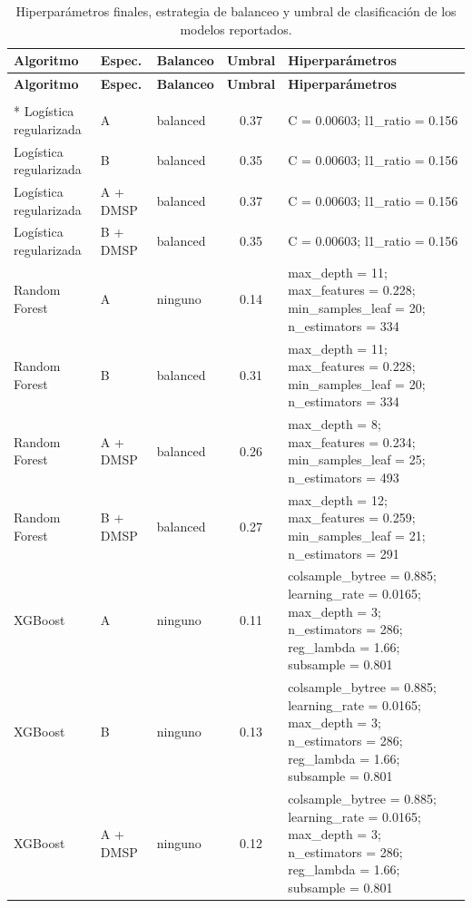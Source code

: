 {\footnotesize
\captionsetup{font=normalsize}
\setlength{\tabcolsep}{4pt}
\begin{longtable}{lllc>{\raggedright\arraybackslash}p{}}
  \caption{Hiperparámetros finales, estrategia de balanceo y umbral de clasificación de los modelos reportados.}
  \label{tab:hiperparametros} \\
  \toprule
  \textbf{Algoritmo} & \textbf{Espec.} & \textbf{Balanceo} & \textbf{Umbral} & \textbf{Hiperparámetros} \\
  \midrule
  \endfirsthead
  \toprule
  \textbf{Algoritmo} & \textbf{Espec.} & \textbf{Balanceo} & \textbf{Umbral} & \textbf{Hiperparámetros} \\
  \midrule
  \endhead
  \bottomrule
  \endlastfoot
  \multicolumn{5}{l}{\textit{Pobreza monetaria, conjunto de prueba 2013$\to$2016}} \\*
  Logística regularizada & A & balanced & 0.37 & C = 0.00603; l1\_ratio = 0.156 \\
  Logística regularizada & B & balanced & 0.35 & C = 0.00603; l1\_ratio = 0.156 \\
  Logística regularizada & A + DMSP & balanced & 0.37 & C = 0.00603; l1\_ratio = 0.156 \\
  Logística regularizada & B + DMSP & balanced & 0.35 & C = 0.00603; l1\_ratio = 0.156 \\
  Random Forest & A & ninguno & 0.14 & max\_depth = 11; max\_features = 0.228; min\_samples\_leaf = 20; n\_estimators = 334 \\
  Random Forest & B & balanced & 0.31 & max\_depth = 11; max\_features = 0.228; min\_samples\_leaf = 20; n\_estimators = 334 \\
  Random Forest & A + DMSP & balanced & 0.26 & max\_depth = 8; max\_features = 0.234; min\_samples\_leaf = 25; n\_estimators = 493 \\
  Random Forest & B + DMSP & balanced & 0.27 & max\_depth = 12; max\_features = 0.259; min\_samples\_leaf = 21; n\_estimators = 291 \\
  XGBoost & A & ninguno & 0.11 & colsample\_bytree = 0.885; learning\_rate = 0.0165; max\_depth = 3; n\_estimators = 286; reg\_lambda = 1.66; subsample = 0.801 \\
  XGBoost & B & ninguno & 0.13 & colsample\_bytree = 0.885; learning\_rate = 0.0165; max\_depth = 3; n\_estimators = 286; reg\_lambda = 1.66; subsample = 0.801 \\
  XGBoost & A + DMSP & ninguno & 0.12 & colsample\_bytree = 0.885; learning\_rate = 0.0165; max\_depth = 3; n\_estimators = 286; reg\_lambda = 1.66; subsample = 0.801 \\

\end{longtable}}
